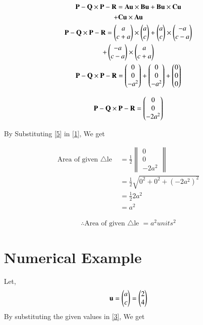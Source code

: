 \documentclass[journal,12pt,twocolumn]{IEEEtran}
\renewcommand\thesection{\arabic{section}}
\begin{document}
\begin{enumerate}[label=\thesection.\arabic*.,ref=\thesection.\theenumi]
\begin{multline}
\Vec{P-Q}\times\Vec{P-R}=\vec{Au}\times\vec{Bu}+\vec{Bu}\times\vec{Cu}\\+\vec{Cu}\times\vec{Au}\\
\Vec{P-Q}\times\Vec{P-R}=\myvec{a\\c+a}\times\myvec{a\\c}+\myvec{a\\c}\times\myvec{-a\\c-a}\\+\myvec{-a\\c-a}\times\myvec{a\\c+a}\\
\Vec{P-Q}\times\Vec{P-R}=\myvec{0\\0\\-a^2}+\myvec{0\\0\\-a^2}+\myvec{0\\0\\0}
\end{multline}

\begin{align}
\Vec{P-Q}\times\Vec{P-R}=\myvec{0\\0\\-2a^2}
\label{5}
\end{align}

By Substituting \eqref{5} in \eqref{1}, We get

\begin{align}
\text{Area of given $\triangle$le }&=\frac{1}{2}\begin{Vmatrix}
0\\0\\-2a^2
\end{Vmatrix}\\
&= \frac{1}{2}\sqrt{0^2 + 0^2+ (-2a^2)^2}\\
&= \frac{1}{2} 2a^2\\
&=a^2
\end{align}

\begin{align}
\boxed{\therefore \text{Area of given $\triangle$le }=a^2 units^2}
\label{4}
\end{align}

\section{Numerical Example}
Let,
\begin{align}
\mathbf{u}=\begin{pmatrix}a\\c\end{pmatrix}=\begin{pmatrix}2\\4\end{pmatrix}
\end{align}
\solution
By substituting the given values in \eqref{3}, We get


\end{enumerate}
\end{document}
